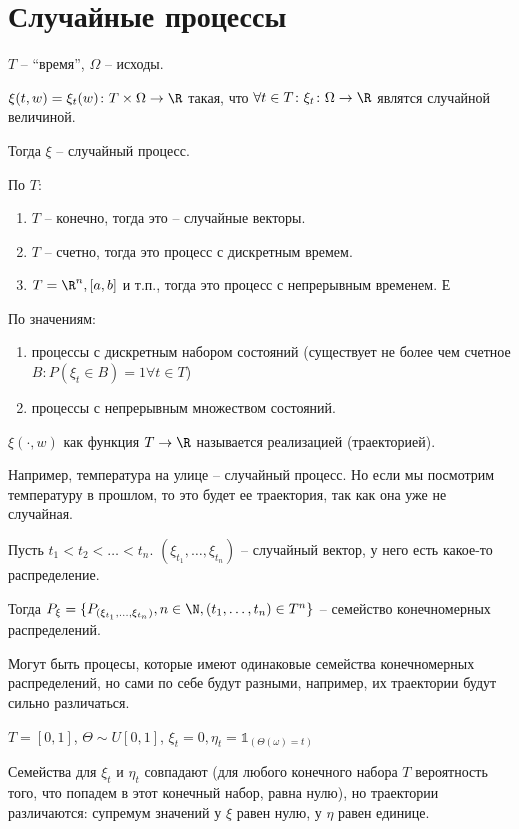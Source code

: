 \chapter{Случайные процессы}
\begin{Def}
$T$ -- ``время'', $\Omega$ -- исходы.

$\xi(t, w) = \xi_t(w) \colon T \times \Omega \to \R$ такая, что $\forall t \in T\colon \xi_t \colon \Omega \to \R$ являтся случайной величиной.

Тогда $\xi$ -- случайный процесс.

По $T$:
\begin{enumerate}
\item $T$ -- конечно, тогда это -- случайные векторы.
\item $T$ -- счетно, тогда это процесс с дискретным времем.
\item $T = \R^n, [a, b]$ и т.п., тогда это процесс с непрерывным временем.
Е\end{enumerate}

По значениям: 
\begin{enumerate}
\item процессы с дискретным набором состояний (существует не более чем счетное $B \colon P(\xi_t \in B) = 1 \forall t \in T$) 
\item процессы с непрерывным множеством состояний.
\end{enumerate}

$\xi (\cdot, w)$ как функция $T \to \R$ называется реализацией (траекторией). 
\end{Def}
\begin{exmp}
Например, температура на улице -- случайный процесс. 
Но если мы посмотрим температуру в прошлом, то это будет ее траектория, так как она уже не случайная.
\end{exmp}

\begin{Def}
Пусть $t_1 < t_2 < \dots < t_n$. $(\xi_{t_1}, \dots, \xi_{t_n})$ -- случайный вектор, у него есть какое-то распределение.

Тогда  $P_\xi = \{ P_{(\xi_{t_1}, \dots, \xi_{t_n})}, n \in \N, (t_1, \dots, t_n) \in T^n \}$ -- семейство конечномерных распределений.
\end{Def}
\begin{exmp}
Могут быть процесы, которые имеют одинаковые семейства конечномерных распределений, но сами по себе будут разными, например, их траектории будут сильно различаться.

$T = [0, 1]$, $\Theta \sim U[0, 1]$, $\xi_t = 0, \eta_t = \mathbb{1}_{(\Theta(\omega) = t)}$

Семейства для $\xi_t$ и $\eta_t$ совпадают (для любого конечного набора $T$ вероятность того, что попадем в этот конечный набор, равна нулю), 
но траектории различаются: супремум значений у $\xi$ равен нулю, у $\eta$ равен единице.
\end{exmp}

